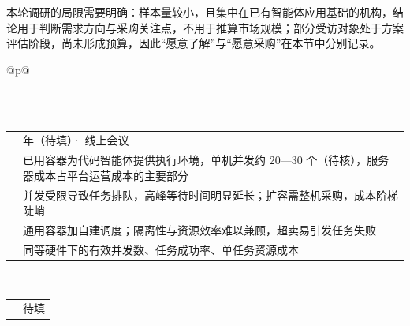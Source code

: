 本轮调研的局限需要明确：样本量较小，且集中在已有智能体应用基础的机构，结论用于判断需求方向与采购关注点，不用于推算市场规模；部分受访对象处于方案评估阶段，尚未形成预算，因此“愿意了解”与“愿意采购”在本节中分别记录。

\FloatBarrier
\begingroup\linespread{1}\selectfont
\setcounter{table}{6}
\begin{longtable}{@{}p{\linewidth}@{}}
\caption{一手调研对象与访谈记录汇总表}\label{tab:4-7}\\
\endfirsthead
{}\\[4pt]
\endhead
\endfoot\endlastfoot
\begin{minipage}{\linewidth}
\begin{tabular}{@{}>{\raggedright\arraybackslash}p{}>{\raggedright\arraybackslash}p{}@{}}
\hline
\rowcolor{WordTableHeader}\multicolumn{2}{@{}p{\linewidth}@{}}{\RecordHeading{编号：I-01\quad 受访角色与企业类型：AI 编程平台 · 技术负责人}} \\ \hline
\rowcolor{white} \TableHeaderText{访谈时间与方式} & 2026 年（待填）· 线上会议 \\ \hline
\rowcolor{white} \TableHeaderText{当前部署与使用情况} & 已用容器为代码智能体提供执行环境，单机并发约 20---30 个（待核），服务器成本占平台运营成本的主要部分 \\ \hline
\rowcolor{white} \TableHeaderText{核心痛点} & 并发受限导致任务排队，高峰等待时间明显延长；扩容需整机采购，成本阶梯陡峭 \\ \hline
\rowcolor{white} \TableHeaderText{现有方案与不足} & 通用容器加自建调度；隔离性与资源效率难以兼顾，超卖易引发任务失败 \\ \hline
\rowcolor{white} \TableHeaderText{采购关注点} & 同等硬件下的有效并发数、任务成功率、单任务资源成本 \\ \hline
\end{tabular}
\end{minipage} \\[6pt]
\begin{minipage}{\linewidth}
\begin{tabular}{@{}>{\raggedright\arraybackslash}p{}>{\raggedright\arraybackslash}p{}@{}}
\hline
\rowcolor{WordTableHeader}\multicolumn{2}{@{}p{\linewidth}@{}}{\RecordHeading{编号：I-02\quad 受访角色与企业类型：AI 编程平台 · 研发平台负责人}} \\ \hline
\rowcolor{white} \TableHeaderText{访谈时间与方式} & 待填 \\ \hline

\end{tabular}
\end{minipage}
\end{longtable}
